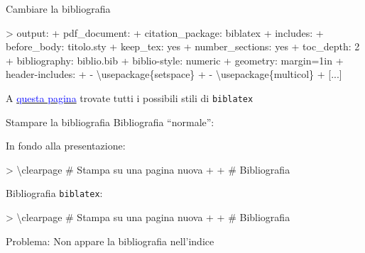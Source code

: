 \documentclass[
  ignorenonframetext,
]{beamer}
\newenvironment{Shaded}{}{}
\newcommand{\BuiltInTok}[1]{#1}
\newcommand{\ExtensionTok}[1]{#1}
\newcommand{\FunctionTok}[1]{#1}
\newcommand{\NormalTok}[1]{#1}
\begin{document}
\begin{frame}[fragile]{Cambiare la bibliografia}
\protect\hypertarget{cambiare-la-bibliografia}{}
\small

\begin{Shaded}
\begin{Highlighting}[]
\NormalTok{\textgreater{} output: }
\NormalTok{+    pdf\_document:}
\NormalTok{+       citation\_package: biblatex}
\NormalTok{+       includes:}
\NormalTok{+         before\_body: titolo.sty}
\NormalTok{+       keep\_tex: yes}
\NormalTok{+       number\_sections: yes}
\NormalTok{+       toc\_depth: 2}
\NormalTok{+ bibliography: biblio.bib}
\NormalTok{+ biblio{-}style: numeric}
\NormalTok{+ geometry: margin=1in}
\NormalTok{+ header{-}includes:}
\NormalTok{+   {-} }\BuiltInTok{\textbackslash{}usepackage}\NormalTok{\{}\ExtensionTok{setspace}\NormalTok{\} }
\NormalTok{+   {-} }\BuiltInTok{\textbackslash{}usepackage}\NormalTok{\{}\ExtensionTok{multicol}\NormalTok{\}}
\NormalTok{+ [...]}
\end{Highlighting}
\end{Shaded}

A
\href{https://www.overleaf.com/learn/latex/Biblatex_citation_styles}{\textcolor{blue}{questa pagina}}
trovate tutti i possibili stili di \texttt{biblatex}
\end{frame}

\begin{frame}[fragile]{Stampare la bibliografia}
\protect\hypertarget{stampare-la-bibliografia}{}
Bibliografia ``normale'':

In fondo alla presentazione:

\begin{Shaded}
\begin{Highlighting}[]
\NormalTok{\textgreater{} }\FunctionTok{\textbackslash{}clearpage}\NormalTok{ \# Stampa su una pagina nuova}
\NormalTok{+ }
\NormalTok{+ \# Bibliografia}
\end{Highlighting}
\end{Shaded}

\pause

Bibliografia \texttt{biblatex}:

\begin{Shaded}
\begin{Highlighting}[]
\NormalTok{\textgreater{} }\FunctionTok{\textbackslash{}clearpage}\NormalTok{ \# Stampa su una pagina nuova}
\NormalTok{+ }
\NormalTok{+ \# Bibliografia}
\end{Highlighting}
\end{Shaded}

\pause

Problema: Non appare la bibliografia nell'indice
\end{frame}
\end{document}
